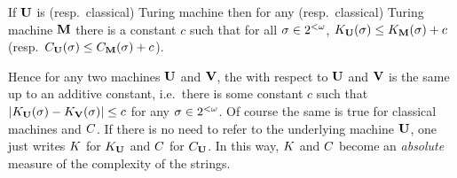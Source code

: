 
\begin{teorema}[Invariance]\label{intro:thm:invariance}
 If ${\bf U}$ is \opt \pfree (resp.\
classical) Turing machine then for any \pfree (resp.\ classical)
Turing machine ${\bf M}$ there is a constant $c$ such that for all
$\sigma\in2^{<\omega}$, $K_{{\bf U}}(\sigma)\leq K_{{\bf M}}(\sigma)+c$ (resp.\
$C_{{\bf U}}(\sigma)\leq C_{{\bf M}}(\sigma)+c$).
\end{teorema}

Hence for any two \pfree \opt machines ${\bf U}$ and ${\bf V}$, the \pfree
\kolcomp with respect to ${\bf U}$ and ${\bf V}$ is the same up to an
additive constant, i.e.\ there is some constant $c$ such that
$\left| K_{{\bf U}}(\sigma)-K_{{\bf V}}(\sigma) \right|\leq c$ for any $\sigma\in2^{<\omega}$. Of
course the same is true for classical machines and $\C$. If there
is no need to refer to the underlying \opt machine ${\bf U}$, one just
writes \glossary{$\K$}$\K$ for $K_{{\bf U}}$ and \glossary{$\C$}$\C$ for
$C_{{\bf U}}$. In this way, $\K$ and $\C$ become an {\em absolute} measure
of the complexity of the strings.

